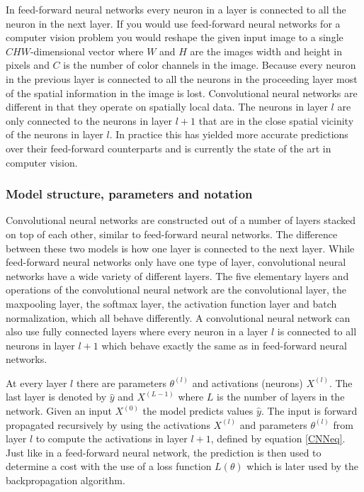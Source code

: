 \documentclass[a4paper,11pt,twoside]{article}
\begin{document}
In feed-forward neural networks every neuron in a layer is connected to all the neuron in the next layer. If you would use feed-forward neural networks for a computer vision problem you would reshape the given input image to a single $CHW$-dimensional vector where $W$ and $H$ are the images width and height in pixels and $C$ is the number of color channels in the image. Because every neuron in the previous layer is connected to all the neurons in the proceeding layer most of the spatial information in the image is lost. Convolutional neural networks are different in that they operate on spatially local data. The neurons in layer $l$ are only connected to the neurons in layer $l+1$ that are in the close spatial vicinity of the neurons in layer $l$. In practice this has yielded more accurate predictions over their feed-forward counterparts and is currently the state of the art in computer vision.

\subsubsection{Model structure, parameters and notation}
Convolutional neural networks are constructed out of a number of layers stacked on top of each other, similar to feed-forward neural networks. The difference between these two models is how one layer is connected to the next layer. While feed-forward neural networks only have one type of layer, convolutional neural networks have a wide variety of different layers. The five elementary layers and operations of the convolutional neural network are the convolutional layer, the maxpooling layer, the softmax layer, the activation function layer and batch normalization, which all behave differently. A convolutional neural network can also use fully connected layers where every neuron in a layer $l$ is connected to all neurons in layer $l+1$ which behave exactly the same as in feed-forward neural networks.

At every layer $l$ there are parameters $\theta^{(l)}$ and activations (neurons) $X^{(l)}$. The last layer is denoted by $\hat{y}$ and $X^{(L-1)}$ where $L$ is the number of layers in the network. Given an input $X^{(0)}$ the model predicts values $\hat{y}$. The input is forward propagated recursively by using the activations $X^{(l)}$ and parameters $\theta^{(l)}$ from layer $l$ to compute the activations in layer $l+1$, defined by equation \eqref{CNNeq}. Just like in a feed-forward neural network, the prediction is then used to determine a cost with the use of a loss function $L(\theta)$ which is later used by the backpropagation algorithm.
\end{document}
